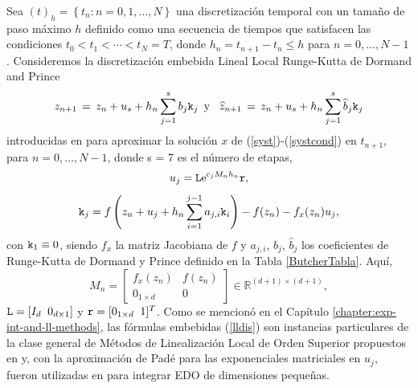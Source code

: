 Sea $\left( t\right) _{h}=\left\{ t_{n}:n=0,1,\ldots ,N\right\}$ una discretización temporal con un tamaño de paso máximo $h$ definido como una secuencia de tiempos que satisfacen las condiciones $t_{0}<t_{1}<\cdots <t_{N}=T$, donde $h_{n}=t_{n+1}-t_{n}\leq h$ para $n=0,\ldots,N-1$.
Consideremos la discretización embebida Lineal Local Runge-Kutta de Dormand and Prince
\begin{equation} \label{lldis}
    z_{n+1}\,=\,z_n+u_s+h_n \sum_{j=1}^{s}b_j \mathtt{k}_j \,\,\, \text{y} \,\,\, \
    \widehat{z}_{n+1}\,=\, z_n+u_s+h_n \sum_{j=1}^{s}\widehat{b}_j \mathtt{k}_j
\end{equation}
introducidas en \cite{Jimenez14AMC} para aproximar la solución $x$ de (\ref{syst})-(\ref{systcond}) en $t_{n+1}$, para $n=0,\ldots,N -1$, donde s = 7 es el número de etapas,
\begin{equation*}
u_j=\mathtt{L}\mathrm{e}^{c_j M_n h_n}\mathtt{r},
\end{equation*}
\begin{equation*}
\mathtt{k}_j = f\left( z_n+u_j+h_n \sum_{i=1}^{j-1}a_{j,i}\mathtt{k}_i \right) - f( z_n) - f_x(z_n)u_j,
\end{equation*}
con $\mathtt{k}_1 \equiv 0$, siendo $f_x$ la matriz Jacobiana de $f$ y $a_{j,i}$, $b_j$, $\widehat{b}_j$ los coeficientes de Runge-Kutta de Dormand y Prince definido en la Tabla \ref{ButcherTabla}. Aquí,
\begin{equation*}
    M_{n}=\left[
    \begin{array}{cc}
        f_{x}(z_{n}) & f(z_{n}) \\
        0_{1\times d} & 0
    \end{array}
    \right] \in \mathbb{R}^{(d+1)\times (d+1)},
\end{equation*}
$ \mathtt{L}=[I_d \;\; 0_{d\times 1}] $ y $\mathtt{r}=[0_{1\times d}\;\; 1]^T$. Como se mencionó en el Capítulo \ref{chapter:exp-int-and-ll-methods}, las fórmulas embebidas (\ref{lldis}) son instancias particulares de la clase general de Métodos de Linealización Local de Orden Superior propuestos en \cite{Jimenez13} y, con la aproximación de Padé para las exponenciales matriciales en $u_j$, fueron utilizadas en \cite{Jimenez14AMC} para integrar EDO de dimensiones pequeñas.

